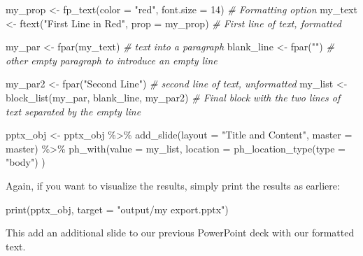 \documentclass[
]{krantz}
\makeatletter
\newenvironment{Shaded}{\begin{snugshade}}{\end{snugshade}}
\newcommand{\AttributeTok}[1]{\textcolor[rgb]{0.61,0.61,0.61}{#1}}
\newcommand{\CommentTok}[1]{\textcolor[rgb]{0.37,0.37,0.37}{\textit{#1}}}
\newcommand{\DecValTok}[1]{\textcolor[rgb]{0.06,0.06,0.06}{#1}}
\newcommand{\FunctionTok}[1]{\textcolor[rgb]{0,0,0}{#1}}
\newcommand{\NormalTok}[1]{#1}
\newcommand{\OtherTok}[1]{\textcolor[rgb]{0.37,0.37,0.37}{#1}}
\newcommand{\SpecialCharTok}[1]{\textcolor[rgb]{0,0,0}{#1}}
\newcommand{\StringTok}[1]{\textcolor[rgb]{0.5,0.5,0.5}{#1}}
\newenvironment{kframe}{%
\medskip{}
\setlength{\fboxsep}{.8em}
 \def\at@end@of@kframe{}%
 \ifinner\ifhmode%
  \def\at@end@of@kframe{\end{minipage}}%
  \begin{minipage}{\columnwidth}%
 \fi\fi%
 \def\FrameCommand##1{\hskip\@totalleftmargin \hskip-\fboxsep
 \colorbox{shadecolor}{##1}\hskip-\fboxsep
     \hskip-\linewidth \hskip-\@totalleftmargin \hskip\columnwidth}%
 \MakeFramed {\advance\hsize-\width
   \@totalleftmargin\z@ \linewidth\hsize
   \@setminipage}}%
 {\par\unskip\endMakeFramed%
 \at@end@of@kframe}
\renewenvironment{Shaded}{\begin{kframe}}{\end{kframe}}
\makeatother
\begin{document}
\begin{Shaded}
\begin{Highlighting}[]
\NormalTok{my\_prop }\OtherTok{\textless{}{-}} \FunctionTok{fp\_text}\NormalTok{(}\AttributeTok{color =} \StringTok{"red"}\NormalTok{, }\AttributeTok{font.size =} \DecValTok{14}\NormalTok{) }\CommentTok{\# Formatting option}
\NormalTok{my\_text }\OtherTok{\textless{}{-}} \FunctionTok{ftext}\NormalTok{(}\StringTok{"First Line in Red"}\NormalTok{, }\AttributeTok{prop =}\NormalTok{ my\_prop) }\CommentTok{\# First line of text, formatted}

\NormalTok{my\_par }\OtherTok{\textless{}{-}} \FunctionTok{fpar}\NormalTok{(my\_text) }\CommentTok{\# text into a paragraph}
\NormalTok{blank\_line }\OtherTok{\textless{}{-}} \FunctionTok{fpar}\NormalTok{(}\StringTok{""}\NormalTok{) }\CommentTok{\# other empty paragraph to introduce an empty line}

\NormalTok{my\_par2 }\OtherTok{\textless{}{-}} \FunctionTok{fpar}\NormalTok{(}\StringTok{"Second Line"}\NormalTok{) }\CommentTok{\# second line of text, unformatted}
\NormalTok{my\_list }\OtherTok{\textless{}{-}} \FunctionTok{block\_list}\NormalTok{(my\_par, blank\_line, my\_par2) }\CommentTok{\# Final block with the two lines of text separated by the empty line}

\NormalTok{pptx\_obj }\OtherTok{\textless{}{-}}\NormalTok{ pptx\_obj }\SpecialCharTok{\%\textgreater{}\%}
  \FunctionTok{add\_slide}\NormalTok{(}\AttributeTok{layout =} \StringTok{"Title and Content"}\NormalTok{, }\AttributeTok{master =}\NormalTok{ master) }\SpecialCharTok{\%\textgreater{}\%} 
  \FunctionTok{ph\_with}\NormalTok{(}\AttributeTok{value =}\NormalTok{ my\_list, }\AttributeTok{location =} \FunctionTok{ph\_location\_type}\NormalTok{(}\AttributeTok{type =} \StringTok{"body"}\NormalTok{) )}
\end{Highlighting}
\end{Shaded}

Again, if you want to visualize the results, simply print the results as earliere:

\begin{Shaded}
\begin{Highlighting}[]
\FunctionTok{print}\NormalTok{(pptx\_obj, }\AttributeTok{target =} \StringTok{"output/my export.pptx"}\NormalTok{)}
\end{Highlighting}
\end{Shaded}

This add an additional slide to our previous PowerPoint deck with our formatted text.
\end{document}
